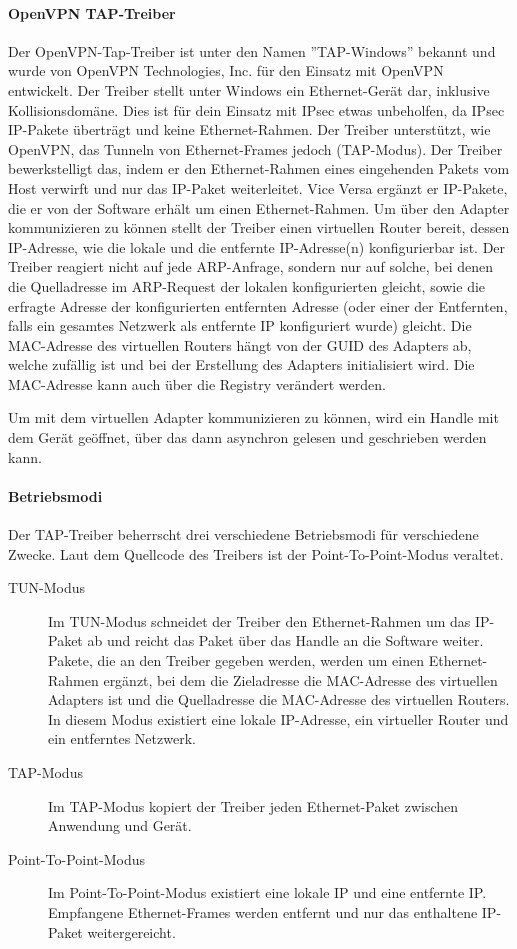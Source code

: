 \paragraph{OpenVPN TAP-Treiber}
Der OpenVPN-Tap-Treiber ist unter den Namen ''TAP-Windows'' bekannt und wurde von
OpenVPN Technologies, Inc. für den Einsatz mit OpenVPN entwickelt.
Der Treiber stellt unter Windows ein Ethernet-Gerät dar, inklusive Kollisionsdomäne.
Dies ist für dein Einsatz mit \ac{IPsec} etwas unbeholfen, da \ac{IPsec} \ac{IP}-Pakete
überträgt und keine Ethernet-Rahmen.
Der Treiber unterstützt, wie OpenVPN, das Tunneln von Ethernet-Frames jedoch (TAP-Modus).
Der Treiber bewerkstelligt das, indem er den Ethernet-Rahmen eines eingehenden Pakets vom
Host verwirft und nur das IP-Paket weiterleitet. Vice Versa ergänzt er IP-Pakete, die er von
der Software erhält um einen Ethernet-Rahmen. Um über den Adapter kommunizieren zu können
stellt der Treiber einen virtuellen Router bereit, dessen \ac{IP}-Adresse, wie die lokale  und
die entfernte IP-Adresse(n) konfigurierbar ist.
Der Treiber reagiert nicht auf jede ARP-Anfrage, sondern nur auf solche, bei denen
die Quelladresse im ARP-Request der lokalen konfigurierten gleicht, sowie die erfragte Adresse
der konfigurierten entfernten Adresse (oder einer der Entfernten, falls ein gesamtes Netzwerk
als entfernte IP konfiguriert wurde) gleicht.
Die MAC-Adresse des virtuellen Routers hängt von der GUID des Adapters ab, welche zufällig ist
und bei der Erstellung des Adapters initialisiert wird. Die MAC-Adresse kann 
auch über die Registry verändert werden.

Um mit dem virtuellen Adapter kommunizieren zu können, wird ein Handle mit dem Gerät
geöffnet, über das dann asynchron gelesen und geschrieben werden kann.

\paragraph{Betriebsmodi}
Der TAP-Treiber beherrscht drei verschiedene Betriebsmodi für verschiedene Zwecke.
Laut dem Quellcode des Treibers ist der Point-To-Point-Modus veraltet.
\begin{description}
\item [TUN-Modus] Im TUN-Modus schneidet der Treiber den Ethernet-Rahmen um das 
IP-Paket ab und reicht das Paket über das Handle an die Software weiter. 
Pakete, die an den Treiber gegeben werden, werden um einen Ethernet-Rahmen
ergänzt, bei dem die Zieladresse die MAC-Adresse des virtuellen Adapters ist 
und die Quelladresse die MAC-Adresse des virtuellen Routers.
In diesem Modus existiert eine lokale IP-Adresse, ein virtueller Router und 
ein entferntes Netzwerk.
\item [TAP-Modus] Im TAP-Modus kopiert der Treiber jeden Ethernet-Paket zwischen 
Anwendung und Gerät.
\item [Point-To-Point-Modus] Im Point-To-Point-Modus existiert eine lokale IP 
und eine entfernte IP. Empfangene Ethernet-Frames werden entfernt und nur
das enthaltene IP-Paket weitergereicht.
\end{description}

